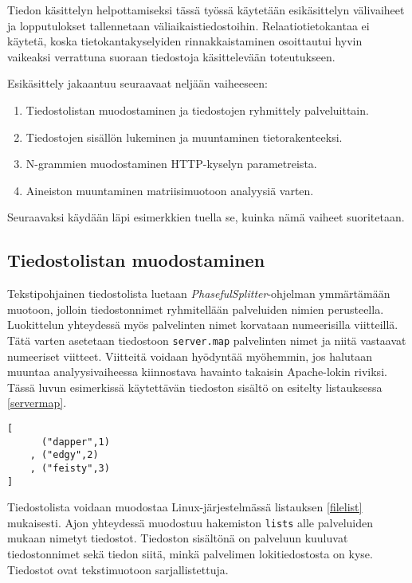 Tiedon käsittelyn helpottamiseksi tässä työssä käytetään esikäsittelyn
välivaiheet ja lopputulokset tallennetaan väliaikaistiedostoihin.
Relaatiotietokantaa ei käytetä, koska tietokantakyselyiden
rinnakkaistaminen osoittautui hyvin vaikeaksi verrattuna suoraan
tiedostoja käsittelevään toteutukseen.

Esikäsittely jakaantuu seuraavaat neljään vaiheeseen:

\begin{enumerate}
\item Tiedostolistan muodostaminen ja tiedostojen ryhmittely palveluittain.
\item Tiedostojen sisällön lukeminen ja muuntaminen tietorakenteeksi.
\item N-grammien muodostaminen HTTP-kyselyn parametreista.
\item Aineiston muuntaminen matriisimuotoon analyysiä varten.
\end{enumerate}

Seuraavaksi käydään läpi esimerkkien tuella se, kuinka nämä vaiheet
suoritetaan.

\subsection{Tiedostolistan muodostaminen}
\label{sec:tiedostolista}

Tekstipohjainen tiedostolista luetaan
\textit{PhasefulSplitter}-ohjelman ymmärtämään muotoon, jolloin
tiedostonnimet ryhmitellään palveluiden nimien perusteella. 
Luokittelun yhteydessä myös palvelinten nimet korvataan numeerisilla
viitteillä. Tätä varten asetetaan tiedostoon \texttt{server.map}
palvelinten nimet ja niitä vastaavat numeeriset viitteet. Viitteitä
voidaan hyödyntää myöhemmin, jos halutaan muuntaa analyysivaiheessa
kiinnostava havainto takaisin Apache-lokin riviksi. Tässä luvun
esimerkissä käytettävän tiedoston sisältö on esitelty listauksessa
\ref{servermap}.

\begin{lstlisting}[language=MyHaskell,float=h,caption=Tiedoston server.map sisältö.,label=servermap]
[
      ("dapper",1)
    , ("edgy",2)
    , ("feisty",3)
]
\end{lstlisting}

Tiedostolista voidaan muodostaa
Linux-järjestelmässä listauksen \ref{filelist} mukaisesti.
Ajon yhteydessä muodostuu hakemiston \texttt{lists} alle palveluiden
mukaan nimetyt tiedostot. Tiedoston sisältönä on palveluun kuuluvat
tiedostonnimet sekä tiedon siitä, minkä palvelimen lokitiedostosta on kyse. Tiedostot ovat tekstimuotoon 
sarjallistettuja.

